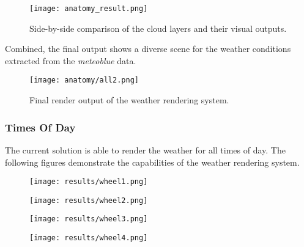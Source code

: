 \begin{figure}[H]
    \texttt{[image: anatomy\_result.png]}
    \caption{Side-by-side comparison of the cloud layers and their visual outputs.}
    \label{img:result:anatomy}
\end{figure}

\noindent
Combined, the final output shows a diverse scene for the weather conditions extracted from the \emph{meteoblue} data.

\begin{figure}[H]
    \texttt{[image: anatomy/all2.png]}
    \caption{Final render output of the weather rendering system.}
    \label{img:result:final1}
\end{figure}

\clearpage

\subsubsection{Times Of Day}
The current solution is able to render the weather for all times of day. The following figures demonstrate the capabilities of the weather rendering system.

\begin{figure}[H]
    \centering
        \begin{minipage}{0.47\linewidth}
            \texttt{[image: results/wheel1.png]}
            \label{img:result:1}
        \end{minipage}
    \hfill
        \begin{minipage}{0.47\linewidth}
            \texttt{[image: results/wheel2.png]}
            \label{img:result:2}
        \end{minipage}
\end{figure}


\begin{figure}[H]
    \centering
        \begin{minipage}{0.47\linewidth}
            \texttt{[image: results/wheel3.png]}
            \label{img:result:3}
        \end{minipage}
    \hfill
        \begin{minipage}{0.47\linewidth}
            \texttt{[image: results/wheel4.png]}
            \label{img:result:4}
        \end{minipage}
\end{figure}



